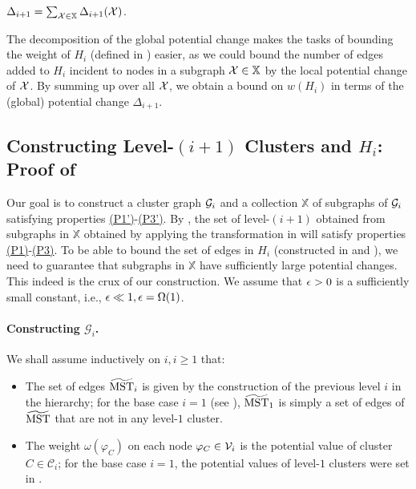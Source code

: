 \begin{claim}\label{clm:localPotenDecomps}$\Delta_{i+1} = \sum_{\mathcal{X} \in \mathbb{X}}\Delta_{i+1}(\mathcal{X})$.
\end{claim}

The decomposition of the global potential change makes the tasks of bounding the weight of $H_i$ (defined in ) easier, as we could  bound the number of edges added to $H_i$ incident to nodes in a subgraph $\mathcal{X}\in \mathbb{X}$ by the local potential change of $\mathcal{X}$. By summing up over all $\mathcal{X}$, we obtain a bound on $w(H_i)$ in terms of the (global) potential change $\Delta_{i+1}$. 


\subsection{Constructing Level-$(i+1)$ Clusters and $H_i$: Proof of }\label{subsec:LeveIplus1Construction}

Our goal is to construct a cluster graph $\mathcal{G}_i$ and a collection  $\mathbb{X}$ of subgraphs of $\mathcal{G}_i$ satisfying properties  \hyperlink{P1'}{(P1')}-\hyperlink{P3'}{(P3')}. By , the set of level-$(i+1)$ obtained from subgraphs in $\mathbb{X}$ obtained by applying the transformation in  will satisfy properties \hyperlink{P1}{(P1)}-\hyperlink{P3}{(P3)}. To be able to bound the set of edges  in $H_i$ (constructed in  and ), we need to guarantee that subgraphs in $\mathbb{X}$ have sufficiently large potential changes. This indeed is the crux of our construction. We assume that  $\epsilon > 0$ is a sufficiently small constant, i.e., $\epsilon \ll 1, \epsilon = \Omega(1)$.

\paragraph{Constructing $\mathcal{G}_i$.~}  We shall assume inductively on $i, i \ge 1$ that:
\begin{itemize}[noitemsep]
	\item The set of edges $\widetilde{\mathrm{MST}}_i$ is given by the construction of the previous level $i$ in the hierarchy; for the base case $i = 1$ (see ), $\widetilde{\mathrm{MST}}_1$ is simply a set of edges of $\widetilde{\mathrm{MST}}$ that are not in any level-$1$ cluster. 
	\item The weight $\omega(\varphi_C )$ on each node $\varphi_C \in \mathcal{V}_i$ is the potential value of cluster $C \in \mathcal{C}_i$; for the base case $i = 1$, the  potential values of level-$1$ clusters were set in .
\end{itemize}


